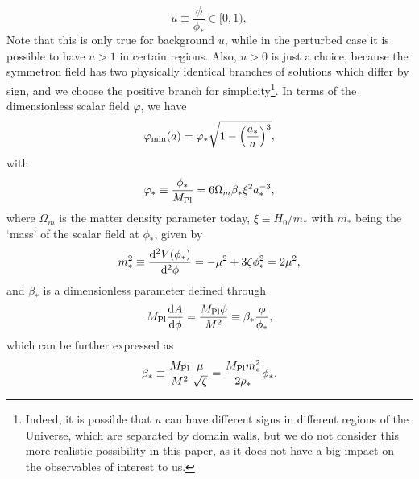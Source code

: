 \begin{equation}
    u \equiv \frac{\phi}{\phi_\ast}\in[0,1),
\end{equation}
Note that this is only true for background $u$, while in the perturbed case it is possible to have $u>1$ in certain regions. Also, $u>0$ is just a choice, because the symmetron field has two physically identical branches of solutions which differ by sign, and we choose the positive branch for simplicity\footnote{Indeed, it is possible that $u$ can have different signs in different regions of the Universe, which are separated by domain walls, but we do not consider this more realistic possibility in this paper, as it does not have a big impact on the observables of interest to us.}. In terms of the dimensionless scalar field $\varphi$, we have \cite{Brax:2012a}
\begin{equation}\label{eq:varphi_min_symm}
    \varphi_{\rm min}(a) = \varphi_\ast\sqrt{1-\left(\frac{a_\ast}{a}\right)^3},
\end{equation}
with
\begin{equation}\label{eq:varphi_ast}
    \varphi_\ast \equiv \frac{\phi_\ast}{M_{\rm Pl}} =  6\Omega_m\beta_\ast\xi^2a_{\ast}^{-3},
\end{equation}
where $\Omega_m$ is the matter density parameter today, $\xi\equiv H_0/m_\ast$ with $m_\ast$ being the `mass' of the scalar field at $\phi_\ast$, given by
\begin{equation}
    m_\ast^2 \equiv \frac{{\rm d}^2V(\phi_\ast)}{{\rm d}^2\phi} = -\mu^2 + 3\zeta\phi^2_\ast = 2\mu^2,
\end{equation}
and $\beta_\ast$ is a dimensionless parameter defined through
\begin{equation}
    M_{\rm Pl}\frac{{\rm d}A}{{\rm d}\phi} = \frac{M_{\rm Pl}\phi}{M^2} \equiv \beta_\ast\frac{\phi}{\phi_\ast},
\end{equation}
which can be further expressed as
\begin{equation}
    \beta_\ast \equiv \frac{M_{\rm Pl}}{M^2}\frac{\mu}{\sqrt{\zeta}} = \frac{M_{\rm Pl}m_\ast^2}{2\rho_\ast}\phi_\ast.
\end{equation}

